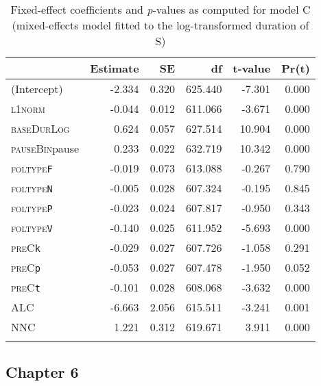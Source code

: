 \begin{table}[H]\fontsize{10}{11}
\caption{Fixed-effect coefficients and \textit{p}-values as computed for model C (mixed-effects model fitted to the log-transformed duration of S)}
\label{tab:5.11}
\centering
\begin{tabular}{lrrrrr} 
\lsptoprule
~             & Estimate & SE    & df      & t-value & Pr(\textbar{}t\textbar{})  \\ 
\midrule
(Intercept)   & -2.334   & 0.320 & 625.440 & -7.301  & 0.000                      \\
\textsc{l1norm}        & -0.044   & 0.012 & 611.066 & -3.671  & 0.000                      \\
\textsc{baseDurLog}    & 0.624    & 0.057 & 627.514 & 10.904  & 0.000                      \\
\textsc{pauseBin}pause & 0.233    & 0.022 & 632.719 & 10.342  & 0.000                      \\
\textsc{foltype}\texttt{F}      & -0.019   & 0.073 & 613.088 & -0.267  & 0.790                      \\
\textsc{foltype}\texttt{N}      & -0.005   & 0.028 & 607.324 & -0.195  & 0.845                      \\
\textsc{foltype}\texttt{P}      & -0.023   & 0.024 & 607.817 & -0.950  & 0.343                      \\
\textsc{foltype}\texttt{V}      & -0.140   & 0.025 & 611.952 & -5.693  & 0.000                      \\
\textsc{preC}\texttt{k}         & -0.029   & 0.027 & 607.726 & -1.058  & 0.291                      \\
\textsc{preC}\texttt{p}         & -0.053   & 0.027 & 607.478 & -1.950  & 0.052                      \\
\textsc{preC}\texttt{t}         & -0.101   & 0.028 & 608.068 & -3.632  & 0.000                      \\
\textsc{ALC}           & -6.663   & 2.056 & 615.511 & -3.241  & 0.001                      \\
\textsc{NNC}           & 1.221    & 0.312 & 619.671 & 3.911   & 0.000                      \\
\lspbottomrule
\end{tabular}
\end{table}


\subsection{Chapter 6}

